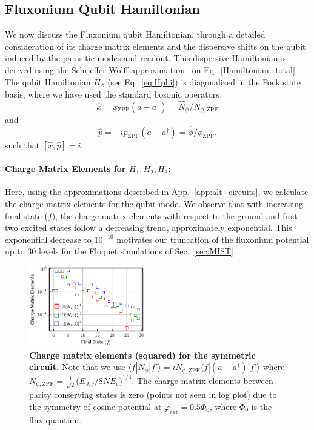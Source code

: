 \documentclass[%
reprint,
superscriptaddress,
 amsmath,amssymb,
 aps,
 prx,
longbibliography,
floatfix,
]{revtex4-2}
\begin{document}
\subsection{Fluxonium Qubit Hamiltonian}
We now discuss the Fluxonium qubit Hamiltonian, through a detailed consideration of its charge matrix elements and the dispersive shifts on the qubit induced by the parasitic modes and readout. This dispersive Hamiltonian is derived using the Schrieffer-Wolff approximation~\cite{viola2015collective} on Eq.~\ref{Hamiltonian_total}. The qubit Hamiltonian $H_{\phi}$ (see Eq.~\ref{eq:Hphi}) is diagonalized in the Fock state basis, where we have used the standard bosonic operators
 \begin{equation} \hat x=x_{\mathrm{ZPF}}(a+a^\dagger)=\hat N_{\phi}/ N_{\phi,\mathrm{ZPF}}
 \end{equation}
 and 
 \begin{equation} \hat p=-ip_{\mathrm{ZPF}}(a-a^\dagger)=\hat \phi/\phi_{\mathrm{ZPF}}.
 \end{equation}
such that $[\hat x,\hat p]=i$.
\paragraph{Charge Matrix Elements for $H_1,H_2,H_3$:}
Here, using the approximations described in App.~\ref{app:alt_circuits}, we calculate the charge matrix elements for the qubit mode. We observe that with increasing final state ($f$), the charge matrix elements with respect to the ground and first two excited states follow a decreasing trend, approximately exponential. This exponential decrease to $10^{-10}$ motivates our truncation of the fluxonium potential up to $30$ levels for the Floquet simulations of Sec.~\ref{sec:MIST}.
\begin{figure}[hbt]
    \centering
\includegraphics[width=0.45\textwidth]{Supp_Fig/Charge_Matrix.pdf}
    \caption{{\bf Charge matrix 
 elements (squared) for the symmetric circuit.} Note that we use $\langle f|N_\phi|f'\rangle=iN_{\phi,\mathrm{ZPF}}\langle f|(a-a^\dagger)|f'\rangle$ where $N_{\phi,\mathrm{ZPF}}=\frac{1}{\sqrt{2}}\Big(E_{J,j}/8NE_{\textrm{c}}\Big)^{1/4}$. The charge matrix elements between parity conserving states is zero (points not seen in log plot) due to the symmetry of cosine potential at $\varphi_\mathrm{ext}=0.5\Phi_0$, where $\Phi_0$ is the flux quantum.}
    \label{charge-matrix}
\end{figure}
\end{document}
